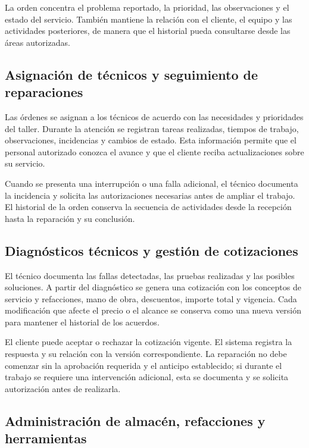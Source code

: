 La orden concentra el problema reportado, la prioridad, las observaciones y el estado del servicio. También mantiene la relación con el cliente, el equipo y las actividades posteriores, de manera que el historial pueda consultarse desde las áreas autorizadas.

\subsection{Asignación de técnicos y seguimiento de reparaciones}

Las órdenes se asignan a los técnicos de acuerdo con las necesidades y prioridades del taller. Durante la atención se registran tareas realizadas, tiempos de trabajo, observaciones, incidencias y cambios de estado. Esta información permite que el personal autorizado conozca el avance y que el cliente reciba actualizaciones sobre su servicio.

Cuando se presenta una interrupción o una falla adicional, el técnico documenta la incidencia y solicita las autorizaciones necesarias antes de ampliar el trabajo. El historial de la orden conserva la secuencia de actividades desde la recepción hasta la reparación y su conclusión.

\subsection{Diagnósticos técnicos y gestión de cotizaciones}

El técnico documenta las fallas detectadas, las pruebas realizadas y las posibles soluciones. A partir del diagnóstico se genera una cotización con los conceptos de servicio y refacciones, mano de obra, descuentos, importe total y vigencia. Cada modificación que afecte el precio o el alcance se conserva como una nueva versión para mantener el historial de los acuerdos.

El cliente puede aceptar o rechazar la cotización vigente. El sistema registra la respuesta y su relación con la versión correspondiente. La reparación no debe comenzar sin la aprobación requerida y el anticipo establecido; si durante el trabajo se requiere una intervención adicional, esta se documenta y se solicita autorización antes de realizarla.

\subsection{Administración de almacén, refacciones y herramientas}

